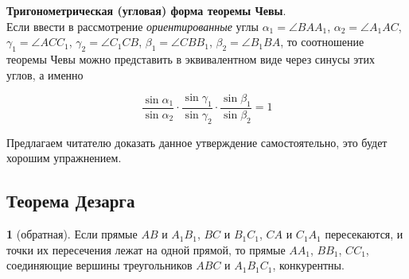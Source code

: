 \documentclass[14pt]{extarticle}
\theoremstyle{definition}
\theoremstyle{theorem}
\newenvironment{namedtheorem}[2]
{
\newcommand{\foo}{#1}
\newtheorem*{\foo{}}{\normalfont\fontsize{15}{15}{Теорема #2}}
\begin{\foo{}}
}
{\end{\foo{}}}
\begin{document}
\begin{figure}
	\hspace{-1cm}
\end{figure}

\noindent \textbf{\small Тригонометрическая (угловая) форма теоремы Чевы}.\\
Если ввести в рассмотрение \textit{ориентированные} углы $\alpha_1 = \angle BAA_1$, 
$\alpha_2 = \angle A_1AC$, $\gamma_1 = \angle ACC_1$, $\gamma_2 = \angle C_1CB$,
$\beta_1 = \angle CBB_1$, $\beta_2 = \angle B_1BA$, то соотношение теоремы
Чевы можно представить в эквивалентном виде через синусы этих углов, а именно


{\setlength{\mathindent}{2.5cm}
\begin{equation*}
\dfrac{\sin \alpha_1}{\sin \alpha_2} \cdot 
	\dfrac{\sin \gamma_1}{\sin \gamma_2} 
\cdot \dfrac{\sin \beta_1}{\sin \beta_2} = 1 
\end{equation*}}
	


Предлагаем читателю доказать данное  утверждение самостоятельно, это 
будет хорошим упражнением.

\subsection{Теорема Дезарга}
\begin{namedtheorem}{dezarg}{Дезарга}[обратная]
Если прямые \(AB\) и \(A_1B_1\), \(BC\) и \(B_1C_1\), \(CA\) и \(C_1A_1\)
пересекаются, и точки их пересечения лежат на одной прямой, то 
прямые \(AA_1\), \(BB_1\), \(CC_1\), соединяющие вершины треугольников 
\(ABC\) и \(A_1B_1C_1\), конкурентны.
\end{namedtheorem}
\end{document}
